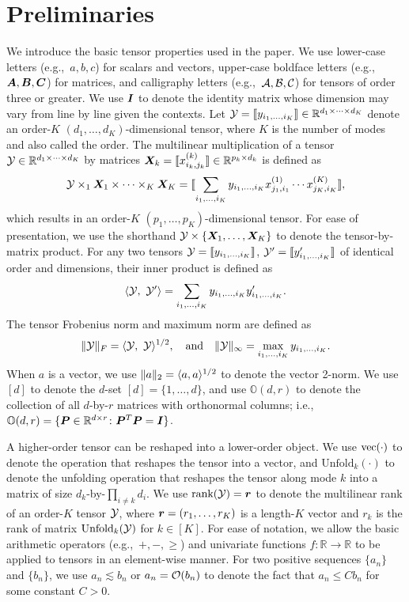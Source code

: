 \documentclass[12pt]{article}
\theoremstyle{definition}
\theoremstyle{definition}
\begin{document}
\section{Preliminaries}\label{sec:pre}
We introduce the basic tensor properties used in the paper. We use lower-case letters (e.g.,\ $a,b,c$) for scalars and vectors, upper-case boldface letters (e.g.,\ $\bm A, \bm B, \bm C$) for matrices, and calligraphy letters (e.g.,\ $\mathcal{A}, \mathcal{B}, \mathcal{C}$) for tensors of order three or greater. We use $\bm I$ to denote the identity matrix whose dimension may vary from line by line given the contexts. Let $\mathcal{Y}=\llbracket y_{i_1,\ldots,i_K} \rrbracket\in \mathbb{R}^{d_1\times \cdots\times d_K}$ denote an order-$K$ $(d_1,\ldots,d_K)$-dimensional tensor, where $K$ is the number of modes and also called the order. The multilinear multiplication of a tensor $\mathcal{Y}\in\mathbb{R}^{d_1\times \cdots\times d_K}$ by matrices $\bm X_k=\llbracket x_{i_k,j_k}^{(k)} \rrbracket\in\mathbb{R}^{p_k\times d_k}$ is defined as 
\[
\mathcal{Y} \times_1\bm X_1\times \cdots \times_K \bm X_K=\llbracket \sum_{i_1,\ldots,i_K}y_{i_1,\ldots,i_K}x_{j_1,i_1}^{(1)}\cdots x_{j_K,i_K}^{(K)} \rrbracket,
\]
which results in an order-$K$ $(p_1,\ldots,p_K)$-dimensional tensor. For ease of presentation, we use the shorthand $\mathcal{Y}\times\{\bm X_1,\ldots,\bm X_K\}$ to denote the tensor-by-matrix product. For any two tensors $\mathcal{Y}=\llbracket y_{i_1,\ldots,i_K} \rrbracket$, $\mathcal{Y}'=\llbracket y'_{i_1,\ldots,i_K} \rrbracket$ of identical order and dimensions, their inner product is defined as 
\[
\langle \mathcal{Y},\ \mathcal{Y}'\rangle =\sum_{i_1,\ldots,i_K}y_{i_1,\ldots,i_K}y'_{i_1,\ldots,i_K}.
\]
The tensor Frobenius norm and maximum norm are defined as
\[
\lVert\mathcal{Y}\rVert_F=\langle \mathcal{Y},\ \mathcal{Y} \rangle^{1/2},\quad \text{and}\quad \lVert\mathcal{Y}\rVert_\infty=\max_{i_1,\ldots,i_K}y_{i_1,\ldots,i_K}.
\]
When $a$ is a vector, we use $\lVert a\rVert_2=\langle a,a \rangle^{1/2}$ to denote the vector 2-norm. We use $[d]$ to denote the $d$-set $[d]=\{1,\ldots,d\}$, and use $\mathbb{O}(d,r)$ to denote the collection of all $d$-by-$r$ matrices with orthonormal columns; i.e., $\mathbb{O}(d,r)=\{\bm{P}\in\mathbb{R}^{d\times r}\colon \bm{P}^T\bm{P} = \bm I\}$. 

A higher-order tensor can be reshaped into a lower-order object. We use $\textup{vec}(\cdot)$ to denote the operation that reshapes the tensor into a vector, and $\text{Unfold}_k(\cdot)$ to denote the unfolding operation that reshapes the tensor along mode $k$ into a matrix of size $d_k$-by-$\prod_{i\neq k}d_i$. We use $\text{rank}(\mathcal{Y})=\bm{r}$ to denote the multilinear rank of an order-$K$ tensor $\mathcal{Y}$, where $\bm{r}=(r_1,\ldots,r_K)$ is a length-$K$ vector and $r_k$ is the rank of matrix $\textup{Unfold}_k(\mathcal{Y})$ for $k\in[K]$. For ease of notation, we allow the basic arithmetic operators (e.g.,\ $+, -, \geq $) and univariate functions $f\colon \mathbb{R}\to \mathbb{R}$ to be applied to tensors in an element-wise manner. For two positive sequences $\{a_n\}$ and $\{b_n\}$, we use $a_n\lesssim b_n$ or $a_n = \mathcal{O}(b_n)$ to denote the fact that $a_n \leq Cb_n$ for some constant $C >0$.
\end{document}
